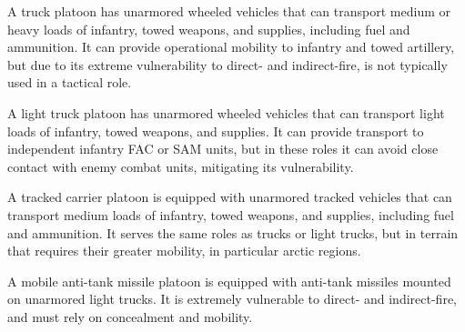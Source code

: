 \begin{withcounters}


    A truck platoon has unarmored wheeled vehicles that can transport medium or heavy loads of infantry, towed weapons, and supplies, including fuel and ammunition.
    It can provide operational mobility to infantry and towed artillery, but due to its extreme vulnerability to direct- and indirect-fire, is not typically used in a tactical role.


    A light truck platoon has unarmored wheeled vehicles that can transport light loads of infantry, towed weapons, and supplies.
    It can provide transport to independent infantry FAC or SAM units, but in these roles it can avoid close contact with enemy combat units, mitigating its vulnerability.\\

    A tracked carrier platoon is equipped with unarmored tracked vehicles that can transport medium loads of infantry, towed weapons, and supplies, including fuel and ammunition.
    It serves the same roles as trucks or light trucks, but in terrain that requires their greater mobility, in particular arctic regions.\\


    A mobile anti-tank missile platoon is equipped with anti-tank missiles mounted on unarmored light trucks.
    It is extremely vulnerable to direct- and indirect-fire, and must rely on concealment and mobility.\\



\end{withcounters}
